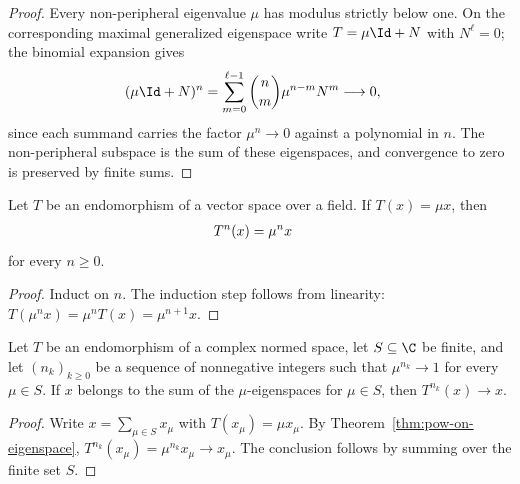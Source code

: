 \begin{proof}\leanok
    Every non-peripheral eigenvalue $\mu$ has modulus strictly below one.
    On the corresponding maximal generalized eigenspace write
    $T=\mu\Id+N$ with $N^{\ell}=0$; the binomial expansion gives
    \begin{align}
        (\mu\Id+N)^{n}
        &=\sum_{m=0}^{\ell-1}\binom{n}{m}\mu^{n-m}N^{m}
        \longrightarrow0,
        \label{eq:non_peripheral_jordan_decay}
    \end{align}
    since each summand carries the factor $\mu^{n}\to0$ against a polynomial
    in $n$. The non-peripheral subspace is the sum of these eigenspaces, and
    convergence to zero is preserved by finite sums.
\end{proof}

\begin{theorem}
    \label{thm:pow-on-eigenspace}
    \leanok
    Let $T$ be an endomorphism of a vector space over a field. If
    $T(x)=\mu x$, then
    \begin{align}
        T^n(x)
         & =\mu^n x
        \notag
    \end{align}
    for every $n\geq0$.
\end{theorem}

\begin{proof}\leanok
    Induct on $n$. The induction step follows from linearity:
    $T(\mu^n x)=\mu^nT(x)=\mu^{n+1}x$.
\end{proof}

\begin{theorem}
    \label{thm:finite-eigenspace-recurrence}
    \leanok
    Let $T$ be an endomorphism of a complex normed space,
    let $S\subseteq\C$ be finite, and let $(n_k)_{k\geq0}$ be a sequence of
    nonnegative integers such that $\mu^{n_k}\to1$ for every $\mu\in S$.
    If $x$ belongs to the sum of the $\mu$-eigenspaces for $\mu\in S$, then
    $T^{n_k}(x)\to x$.
\end{theorem}

\begin{proof}\leanok
    Write $x=\sum_{\mu\in S}x_\mu$ with $T(x_\mu)=\mu x_\mu$. By
    Theorem~\ref{thm:pow-on-eigenspace},
    $T^{n_k}(x_\mu)=\mu^{n_k}x_\mu\to x_\mu$. The conclusion follows by
    summing over the finite set $S$.
\end{proof}

